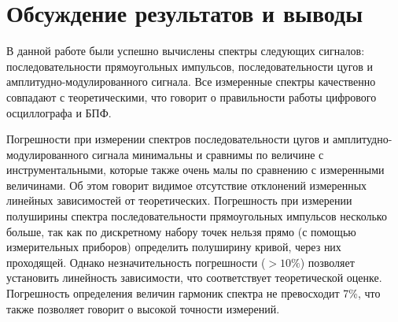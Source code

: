 \documentclass[a4paper,12pt]{article} %
\begin{document}
\section{Обсуждение результатов и выводы}

В данной работе были успешно вычислены спектры следующих сигналов: последовательности прямоугольных импульсов, последовательности цугов и амплитудно-модулированного сигнала. Все измеренные спектры качественно совпадают с теоретическими, что говорит о правильности работы цифрового осциллографа и БПФ. 

Погрешности при измерении спектров последовательности цугов и амплитудно-модулированного сигнала минимальны и сравнимы по величине с инструментальными, которые также очень малы по сравнению с измеренными величинами. Об этом говорит видимое отсутствие отклонений измеренных линейных зависимостей от теоретических. Погрешность при измерении полуширины спектра последовательности прямоугольных импульсов несколько больше, так как по дискретному набору точек нельзя прямо (с помощью измерительных приборов) определить полуширину кривой, через них проходящей. Однако незначительность погрешности ($> 10\%$) позволяет установить линейность зависимости, что соответствует теоретической оценке. Погрешность определения величин гармоник спектра не превосходит 7\%, что также позволяет говорит о высокой точности измерений.    
\end{document}
